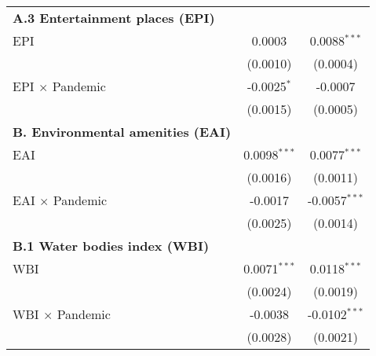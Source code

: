 {\begin{tabular}{lcc}
      \textbf{A.3 Entertainment places (EPI)}\\
      \hspace{0.5cm} EPI                                       & 0.0003        & 0.0088$^{***}$            \\
      \hspace{0.5cm}                                           & (0.0010)      & (0.0004)                  \\
      \hspace{0.5cm} EPI $\times$ Pandemic                     & -0.0025$^{*}$ & -0.0007                   \\
      \hspace{0.5cm}                                           & (0.0015)      & (0.0005)                  \\

      \textbf{B. Environmental amenities (EAI)}\\
      \hspace{0.5cm} EAI                                       & 0.0098$^{***}$ & 0.0077$^{***}$           \\
      \hspace{0.5cm}                                           & (0.0016)       & (0.0011)                 \\
      \hspace{0.5cm} EAI $\times$ Pandemic                     & -0.0017        & -0.0057$^{***}$          \\
      \hspace{0.5cm}                                           & (0.0025)       & (0.0014)                 \\

      \textbf{B.1 Water bodies index (WBI)}\\
      \hspace{0.5cm} WBI                                       & 0.0071$^{***}$ & 0.0118$^{***}$           \\
      \hspace{0.5cm}                                           & (0.0024)       & (0.0019)                 \\
      \hspace{0.5cm} WBI $\times$ Pandemic                     & -0.0038        & -0.0102$^{***}$          \\
      \hspace{0.5cm}                                           & (0.0028)       & (0.0021)                 \\


\end{tabular}}
